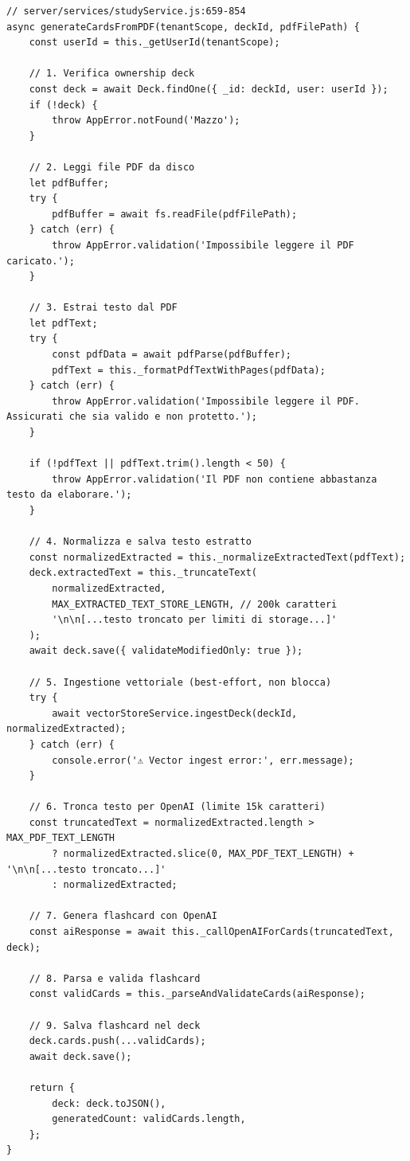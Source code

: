 \documentclass[11pt,a4paper]{article}
\begin{document}
\begin{lstlisting}[caption=Metodo Principale - generateCardsFromPDF]
// server/services/studyService.js:659-854
async generateCardsFromPDF(tenantScope, deckId, pdfFilePath) {
    const userId = this._getUserId(tenantScope);

    // 1. Verifica ownership deck
    const deck = await Deck.findOne({ _id: deckId, user: userId });
    if (!deck) {
        throw AppError.notFound('Mazzo');
    }

    // 2. Leggi file PDF da disco
    let pdfBuffer;
    try {
        pdfBuffer = await fs.readFile(pdfFilePath);
    } catch (err) {
        throw AppError.validation('Impossibile leggere il PDF caricato.');
    }

    // 3. Estrai testo dal PDF
    let pdfText;
    try {
        const pdfData = await pdfParse(pdfBuffer);
        pdfText = this._formatPdfTextWithPages(pdfData);
    } catch (err) {
        throw AppError.validation('Impossibile leggere il PDF. Assicurati che sia valido e non protetto.');
    }

    if (!pdfText || pdfText.trim().length < 50) {
        throw AppError.validation('Il PDF non contiene abbastanza testo da elaborare.');
    }

    // 4. Normalizza e salva testo estratto
    const normalizedExtracted = this._normalizeExtractedText(pdfText);
    deck.extractedText = this._truncateText(
        normalizedExtracted,
        MAX_EXTRACTED_TEXT_STORE_LENGTH, // 200k caratteri
        '\n\n[...testo troncato per limiti di storage...]'
    );
    await deck.save({ validateModifiedOnly: true });

    // 5. Ingestione vettoriale (best-effort, non blocca)
    try {
        await vectorStoreService.ingestDeck(deckId, normalizedExtracted);
    } catch (err) {
        console.error('⚠️ Vector ingest error:', err.message);
    }

    // 6. Tronca testo per OpenAI (limite 15k caratteri)
    const truncatedText = normalizedExtracted.length > MAX_PDF_TEXT_LENGTH 
        ? normalizedExtracted.slice(0, MAX_PDF_TEXT_LENGTH) + '\n\n[...testo troncato...]'
        : normalizedExtracted;

    // 7. Genera flashcard con OpenAI
    const aiResponse = await this._callOpenAIForCards(truncatedText, deck);

    // 8. Parsa e valida flashcard
    const validCards = this._parseAndValidateCards(aiResponse);

    // 9. Salva flashcard nel deck
    deck.cards.push(...validCards);
    await deck.save();

    return {
        deck: deck.toJSON(),
        generatedCount: validCards.length,
    };
}
\end{lstlisting}
\end{document}

